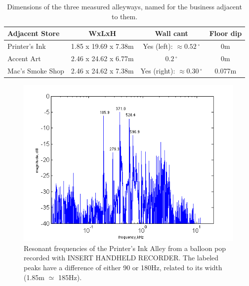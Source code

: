 \documentclass{aes137}
\renewcommand{\deg}{\,^{\circ}}
\begin{document}
\begin{table}
\begin{center} 
\begin{tabular}{|l|c|c|c|}
\hline
\textbf{Adjacent Store} & \textbf{WxLxH} & \textbf{Wall cant} & \textbf{Floor dip} \\
\hline
Printer's Ink & 1.85 x 19.69 x 7.38m & Yes (left): $\approx0.52\deg$ & 0m \\
\hline
Accent Art & 2.46 x 24.62 x 6.77m & $0.2\deg$ & 0m \\
\hline
Mac's Smoke Shop & 2.46 x 24.62 x 7.38m & Yes (right): $\approx0.30\deg$ & 0.077m \\
\hline
\end{tabular} \caption{Dimensions of the three measured alleyways, named for the business adjacent to them.} 
\end{center}
\label{table:geometries}
\end{table}


\begin{figure}[h!] \centering \includegraphics[width=\linewidth]{images/printers_labeled_IR.png} \caption{Resonant frequencies of the Printer's Ink Alley from a balloon pop recorded with INSERT HANDHELD RECORDER. The labeled peaks have a difference of either 90 or 180Hz, related to its width (1.85m $\simeq$ 185Hz).} \end{figure}
\end{document}
